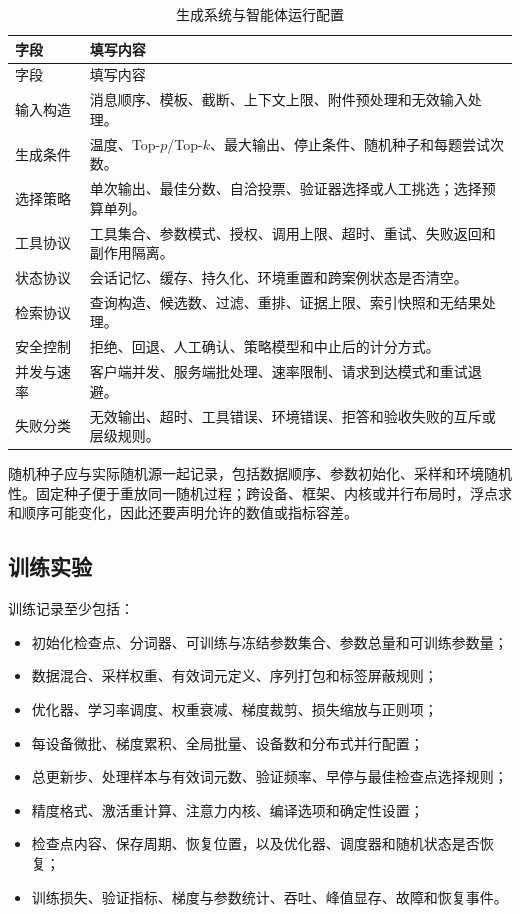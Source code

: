 \documentclass[../textbook.tex]{subfiles}
\begin{document}
\begin{longtable}{@{}p{.25\linewidth}p{.66\linewidth}@{}}
\caption{生成系统与智能体运行配置}\label{tab:appendix-generation-protocol}\\
\toprule
字段 & 填写内容\\\midrule
\endfirsthead
\toprule
字段 & 填写内容\\\midrule
\endhead
输入构造 & 消息顺序、模板、截断、上下文上限、附件预处理和无效输入处理。\\
生成条件 & 温度、Top-$p$/Top-$k$、最大输出、停止条件、随机种子和每题尝试次数。\\
选择策略 & 单次输出、最佳分数、自洽投票、验证器选择或人工挑选；选择预算单列。\\
工具协议 & 工具集合、参数模式、授权、调用上限、超时、重试、失败返回和副作用隔离。\\
状态协议 & 会话记忆、缓存、持久化、环境重置和跨案例状态是否清空。\\
检索协议 & 查询构造、候选数、过滤、重排、证据上限、索引快照和无结果处理。\\
安全控制 & 拒绝、回退、人工确认、策略模型和中止后的计分方式。\\
并发与速率 & 客户端并发、服务端批处理、速率限制、请求到达模式和重试退避。\\
失败分类 & 无效输出、超时、工具错误、环境错误、拒答和验收失败的互斥或层级规则。\\
\bottomrule
\end{longtable}

随机种子应与实际随机源一起记录，包括数据顺序、参数初始化、采样和环境随机性。固定种子便于重放同一随机过程；跨设备、框架、内核或并行布局时，浮点求和顺序可能变化，因此还要声明允许的数值或指标容差。

\subsection{训练实验}

训练记录至少包括：
\begin{itemize}
 \item 初始化检查点、分词器、可训练与冻结参数集合、参数总量和可训练参数量；
 \item 数据混合、采样权重、有效词元定义、序列打包和标签屏蔽规则；
 \item 优化器、学习率调度、权重衰减、梯度裁剪、损失缩放与正则项；
 \item 每设备微批、梯度累积、全局批量、设备数和分布式并行配置；
 \item 总更新步、处理样本与有效词元数、验证频率、早停与最佳检查点选择规则；
 \item 精度格式、激活重计算、注意力内核、编译选项和确定性设置；
 \item 检查点内容、保存周期、恢复位置，以及优化器、调度器和随机状态是否恢复；
 \item 训练损失、验证指标、梯度与参数统计、吞吐、峰值显存、故障和恢复事件。
\end{itemize}
\end{document}
